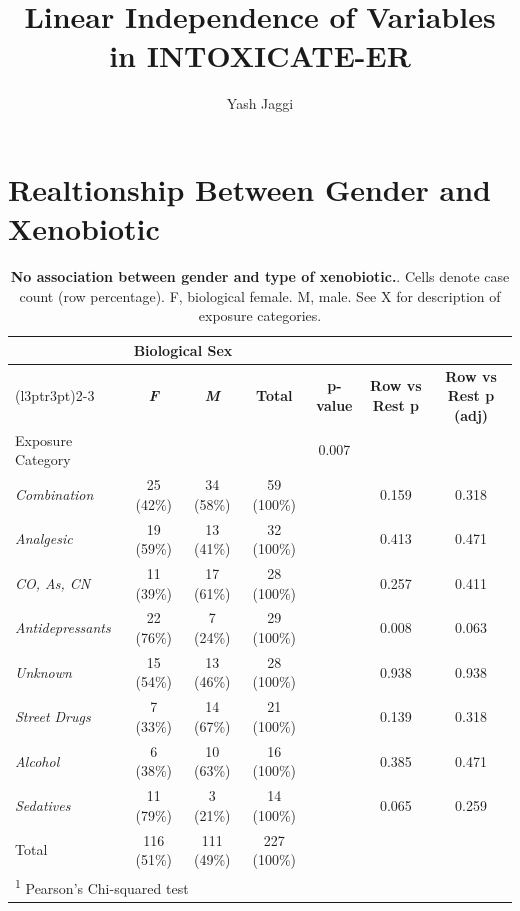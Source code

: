 \documentclass[
]{article}
\title{Linear Independence of Variables in INTOXICATE-ER}
\author{Yash Jaggi}
\date{}
\begin{document}
\maketitle

\section*{Realtionship Between Gender and Xenobiotic}\label{realtionship-between-gender-and-xenobiotic}

\begin{table}[!h]
\centering
\caption{\label{tab:table1}\textbf{No association between gender and type of xenobiotic.}. Cells denote case count (row percentage). F, biological female. M, male. See X for description of exposure categories.}
\centering
\begin{tabular}[t]{lcccccc}
\toprule
\multicolumn{1}{c}{ } & \multicolumn{2}{c}{Biological Sex} & \multicolumn{4}{c}{ } \\
\cmidrule(l{3pt}r{3pt}){2-3}
\textbf{} & \textbf{\textit{F}} & \textbf{\textit{M}} & \textbf{Total} & \textbf{p-value} & \textbf{\textbf{Row vs Rest p}} & \textbf{\textbf{Row vs Rest p (adj)}}\\
\midrule
Exposure Category &  &  &  & 0.007 &  & \\
\hspace{1em}\em{Combination} & 25 (42\%) & 34 (58\%) & 59 (100\%) &  & 0.159 & 0.318\\
\hspace{1em}\em{Analgesic} & 19 (59\%) & 13 (41\%) & 32 (100\%) &  & 0.413 & 0.471\\
\hspace{1em}\em{CO, As, CN} & 11 (39\%) & 17 (61\%) & 28 (100\%) &  & 0.257 & 0.411\\
\hspace{1em}\em{Antidepressants} & 22 (76\%) & 7 (24\%) & 29 (100\%) &  & 0.008 & 0.063\\
\addlinespace
\hspace{1em}\em{Unknown} & 15 (54\%) & 13 (46\%) & 28 (100\%) &  & 0.938 & 0.938\\
\hspace{1em}\em{Street Drugs} & 7 (33\%) & 14 (67\%) & 21 (100\%) &  & 0.139 & 0.318\\
\hspace{1em}\em{Alcohol} & 6 (38\%) & 10 (63\%) & 16 (100\%) &  & 0.385 & 0.471\\
\hspace{1em}\em{Sedatives} & 11 (79\%) & 3 (21\%) & 14 (100\%) &  & 0.065 & 0.259\\
Total & 116 (51\%) & 111 (49\%) & 227 (100\%) &  &  & \\
\bottomrule
\multicolumn{7}{l}{\rule{0pt}{1em}\textsuperscript{1} Pearson's Chi-squared test}\\
\end{tabular}
\end{table}
\end{document}
